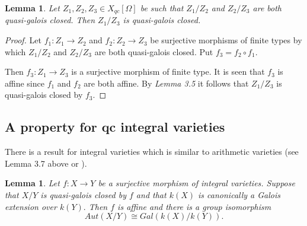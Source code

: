 \documentclass[12pt,twoside,reqno]{amsart}
\newtheorem{lemma}[theorem]{Lemma}
\theoremstyle{definition}
\numberwithin{equation}{section}
\begin{document}
\begin{lemma}
Let $Z_{1},Z_{2},Z_{3}\in X_{qc}\left[ \Omega \right] $ be such that $Z_{1}/Z_{2}$ and $Z_{2}/Z_{3}$ are both quasi-galois closed. Then $Z_{1}/Z_{3}$ is quasi-galois closed. \
\end{lemma}

\begin{proof}
Let $f_{1}:Z_{1}\rightarrow Z_{2}$ and $f_{2}:Z_{2}\rightarrow
Z_{3} $ be surjective morphisms of finite types by which $Z_{1}/Z_{2}$ and $Z_{2}/Z_{3}$ are both quasi-galois closed. Put $f_{3}=f_{2}\circ f_{1}.$

Then $f_{3}:Z_{1}\rightarrow Z_{3}$ is a surjective morphism of finite type.
It is seen that $f_{3}$ is affine since $f_{1}$ and $f_{2}$ are both affine.
By \emph{Lemma 3.5} it follows that $Z_{1}/Z_{3}$ is quasi-galois closed by $f_{3}$.
\end{proof}

\subsection{A property for qc integral varieties}

There is a result for integral varieties which is similar to arithmetic
varieties (see Lemma 3.7 above or \cite{An2}).

\begin{lemma}
Let $f:X\rightarrow Y$ be a surjective morphism of integral varieties.
Suppose that $X/Y$ is quasi-galois closed by $f$ and that $k\left( X\right) $
is canonically a Galois extension over $k\left( Y\right) .$ Then $f$ is
affine and there is a group isomorphism
\begin{equation*}
Aut\left( X/Y\right) \cong Gal\left( k\left( X\right) /k\left( Y\right)
\right) .
\end{equation*}
\end{lemma}
\end{document}
